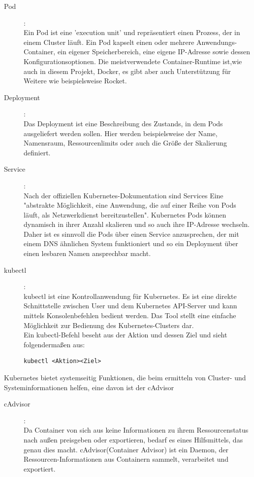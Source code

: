 \documentclass[a4paper,10pt]{scrartcl}
\begin{document}
\begin{description}

\item [Pod]:\\
Ein Pod ist eine 'execution unit' und repräsentiert einen Prozess, der in einem Cluster läuft. Ein Pod kapselt einen oder mehrere Anwendungs-Container, ein eigener Speicherbereich, eine eigene IP-Adresse sowie dessen Konfigurationsoptionen.
Die meistverwendete Container-Runtime ist,wie auch in diesem Projekt, Docker, es gibt aber auch Unterstützung für Weitere wie beispielsweise Rocket.\\
\item [Deployment]:\\
Das Deployment ist eine Beschreibung des Zustands, in dem Pods ausgeliefert werden sollen. Hier werden beispielsweise der Name, Namensraum, Ressourcenlimits oder auch die Größe der Skalierung definiert.
\item [Service]:\\
Nach der offiziellen Kubernetes-Dokumentation sind Services Eine "abstrakte Möglichkeit, eine Anwendung, die auf einer Reihe von Pods läuft, als Netzwerkdienst bereitzustellen".
Kubernetes Pods können dynamisch in ihrer Anzahl skalieren und so auch ihre IP-Adresse wechseln. Daher ist es sinnvoll die Pods über einen Service anzusprechen, der mit einem DNS ähnlichen System funktioniert und so ein Deployment über einen lesbaren Namen ansprechbar macht. 
\item [kubectl]:\\
kubectl ist eine Kontrollanwendung für Kubernetes. Es ist eine direkte Schnittstelle zwischen User und dem Kubernetes API-Server und kann mittels Konsolenbefehlen bedient werden. Das Tool stellt eine einfache Möglichkeit zur Bedienung des Kubernetes-Clusters dar. \\
Ein kubectl-Befehl beseht aus der Aktion und dessen Ziel und sieht folgendermaßen aus:
\begin{lstlisting}
kubectl <Aktion><Ziel>
\end{lstlisting}

\end{description}

Kubernetes bietet systemseitig Funktionen, die beim ermitteln von Cluster- und Systeminformationen helfen, eine davon ist der cAdvisor
 
\begin{description} 
\item [cAdvisor]:\\
Da Container von sich aus keine Informationen zu ihrem Ressourcenstatus nach außen preisgeben oder exportieren, bedarf es eines Hilfsmittels, das genau dies macht.
cAdvisor(Container Advisor) ist ein Daemon, der Ressourcen-Informationen aus Containern sammelt, verarbeitet und exportiert.\cite{.20200704T23:29:24.000Z}

\end{description}
\end{document}
